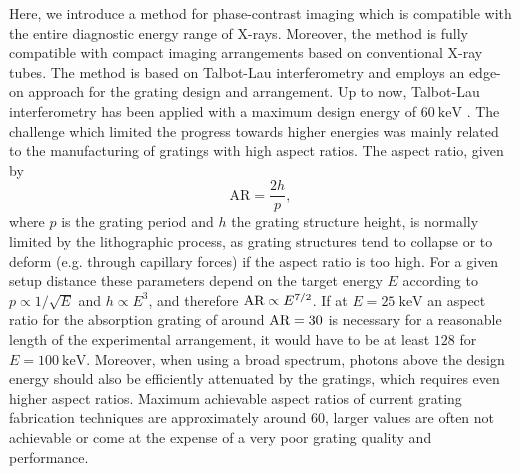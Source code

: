 \documentclass[aip,apl,amsmath,amssymb,floatfix,reprint,a4paper]{revtex4-1}
\begin{document}
Here, we introduce a method for phase-contrast imaging which is
compatible with the entire diagnostic energy range of X-rays. Moreover, the
method is fully compatible with compact imaging arrangements based on
conventional X-ray tubes. The method is based on Talbot-Lau interferometry
\cite{Pfeiffer2006} and employs an edge-on approach for the grating design and
arrangement. Up to now, Talbot-Lau interferometry has been applied with a
maximum design energy of $\SI{60}{\kilo\electronvolt}$ \cite{Donath2009}.
The challenge which limited the progress towards higher energies was mainly
related to the manufacturing of gratings with high aspect ratios. The aspect
ratio, given by
\begin{equation}
    \text{AR} = \frac{2h}{p},
\end{equation}
where $p$ is the grating period and $h$ the grating structure
height, is normally limited by the lithographic process, as grating
structures tend to collapse or to deform (e.g. through capillary forces) if
the aspect ratio is too high. For a given setup distance these parameters
depend on the target energy $E$ according to $p \propto
1/\sqrt{E}$ and $h \propto E^3$, and therefore $\textnormal{AR}
\propto E^{7/2}$\cite{Momose2003a}. If at $E=\SI{25}{\kilo\electronvolt}$ an aspect ratio
for the absorption grating of around $\textnormal{AR}=30$ is necessary for a
reasonable length of the experimental arrangement, it would have to be at
least $128$ for $E=\SI{100}{\kilo\electronvolt}$. Moreover, when using a
broad spectrum, photons above the design energy should also be
efficiently attenuated by the gratings, which requires even higher aspect ratios.
Maximum achievable aspect ratios of current grating fabrication techniques
\cite{David2007,Kenntner2010} are approximately around 60,
larger values are often not achievable or come at the expense of a very poor
grating quality and performance.
\end{document}
